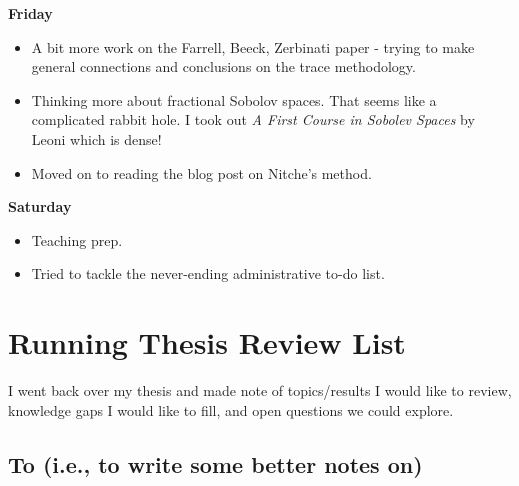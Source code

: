 \documentclass[12pt,a4paper]{article}
\begin{document}
\textbf{Friday}

\begin{itemize}
    \item A bit more work on the Farrell, Beeck, Zerbinati paper - trying to make general connections and conclusions on the trace methodology. 
    \item Thinking more about fractional Sobolov spaces. That seems like a complicated rabbit hole. I took out \textit{A First Course in Sobolev Spaces} by Leoni which is dense!
    \item Moved on to reading the blog post on Nitche's method. 
\end{itemize}


\textbf{Saturday}
\begin{itemize}
    \item Teaching prep. 
    \item Tried to tackle the never-ending administrative to-do list. 
\end{itemize}


\newpage

\section{Running Thesis Review List}

I went back over my thesis and made note of topics/results I would like to review, knowledge gaps I would like to fill, and open questions we could explore. 

\subsection{To  (i.e., to write some better notes on)}
\end{document}

